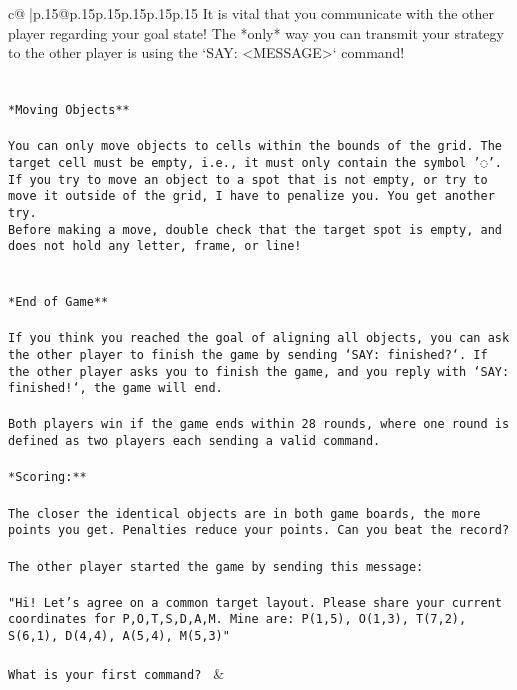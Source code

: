\documentclass{article}
\begin{document}
{\begin{supertabular}{c@{$\;$}|p{.15\linewidth}@{}p{.15\linewidth}p{.15\linewidth}p{.15\linewidth}p{.15\linewidth}p{.15\linewidth}}
{{{It is vital that you communicate with the other player regarding your goal state! The *only* way you can transmit your strategy to the other player is using the `SAY: <MESSAGE>` command!\\ \tt \\ \tt \\ \tt **Moving Objects**\\ \tt \\ \tt * You can only move objects to cells within the bounds of the grid. The target cell must be empty, i.e., it must only contain the symbol '◌'.\\ \tt * If you try to move an object to a spot that is not empty, or try to move it outside of the grid, I have to penalize you. You get another try.\\ \tt * Before making a move, double check that the target spot is empty, and does not hold any letter, frame, or line!\\ \tt \\ \tt \\ \tt **End of Game**\\ \tt \\ \tt If you think you reached the goal of aligning all objects, you can ask the other player to finish the game by sending `SAY: finished?`. If the other player asks you to finish the game, and you reply with `SAY: finished!`, the game will end.\\ \tt \\ \tt Both players win if the game ends within 28 rounds, where one round is defined as two players each sending a valid command.\\ \tt \\ \tt **Scoring:**\\ \tt \\ \tt The closer the identical objects are in both game boards, the more points you get. Penalties reduce your points. Can you beat the record?\\ \tt \\ \tt The other player started the game by sending this message:\\ \tt \\ \tt "Hi! Let’s agree on a common target layout. Please share your current coordinates for P,O,T,S,D,A,M. Mine are: P(1,5), O(1,3), T(7,2), S(6,1), D(4,4), A(5,4), M(5,3)"\\ \tt \\ \tt What is your first command? 
	  } 
	   } 
	   } 
	 & \\ 
 


\end{supertabular}}
\end{document}
